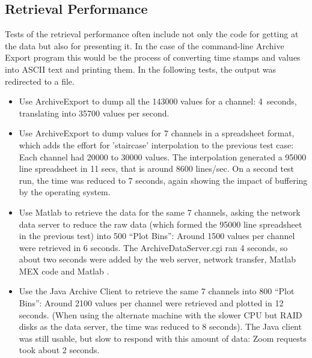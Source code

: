 \subsection{Retrieval Performance}
Tests of the retrieval performance often include not only the
code for getting at the data but also for presenting it. In the
case of the command-line Archive Export program this would be the process
of converting time stamps and values into ASCII text and printing them.
In the following tests, the output was redirected to a file.
\begin{itemize}
\item Use ArchiveExport to dump all the 143000 values for a channel:
      4~seconds, translating into 35700 values per second.
\item Use ArchiveExport to dump values for 7 channels in a spreadsheet format,
      which adds the effort for 'staircase' interpolation to the
      previous test case:
      Each channel had 20000 to 30000 values. The interpolation generated
      a 95000 line spreadsheet in 11 secs, that is around 8600 lines/sec.
      On a second test run, the time was reduced to 7 seconds, again
      showing the impact of buffering by the operating system.
\item Use Matlab to retrieve the data for the same 7 channels,
      asking the network data server to reduce the raw data (which
      formed the 95000 line spreadsheet in the previous test) into
      500 ``Plot Bins'':
      Around 1500 values per channel were retrieved in 6 seconds.
      The ArchiveDataServer.cgi ran 4 seconds, so about two
      seconds were added by the web server, network transfer, Matlab
      MEX code and Matlab .
\item Use the Java Archive Client to retrieve the same 7 channels into 800
      ``Plot Bins'':
      Around 2100 values per channel were retrieved and plotted in 12 seconds.
      (When using the alternate machine with the slower CPU but RAID disks as 
      the data server, the time was reduced to 8 seconds).
      The Java client was still usable, but slow to respond with this amount of data:
      Zoom requests took about 2 seconds.
\end{itemize}


